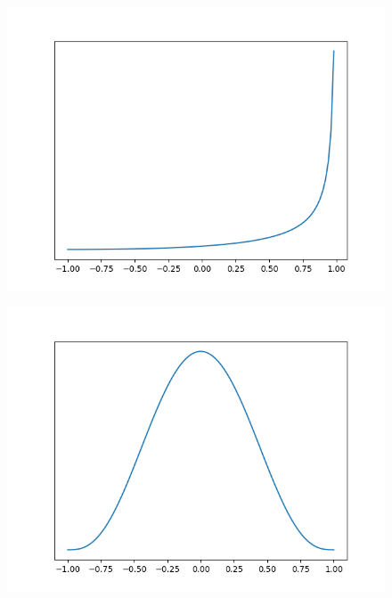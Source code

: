 \begin{figure}[!htbp]
    \centering
    \includegraphics[scale=0.5]
    {./content/figures/dists/beta_3_0.3}
    \caption{}
    \label{fig:beta-3-0.3}
\end{figure}

\begin{figure}[!htbp]
    \centering
    \includegraphics[scale=0.5]
    {./content/figures/dists/beta_4_4}
    \caption{}
    \label{fig:beta-4-4}
\end{figure}

